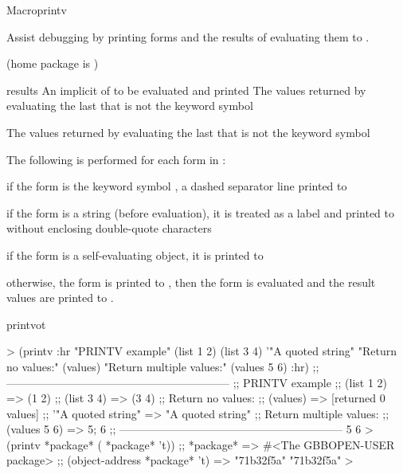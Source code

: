 \documentclass[10pt,twoside,english,pdftex]{article}
\begin{document}

\begin{functiondoc}{Macro}{printv}{%
    }
% 

\fnsyntax

\fnpurpose Assist debugging by printing forms and the results of
evaluating them to .

\fnpackage {} (home package is
)

\fnmodule {}

\fnargs
\begin{args}{results}
\arg[forms] An implicit  of  to be
evaluated and printed  
\arg[results] The values returned by evaluating the last 
that is not the keyword symbol 
\end{args}

\fnreturns The values returned by evaluating the last  that is not
the keyword symbol 

\fndescription The following is performed for each form in :
\begin{tightitemize}
\item if the form is the keyword symbol , a dashed separator line
  printed to 
\item if the form is a string (before evaluation), it is treated as a label
  and printed to  without enclosing double-quote
  characters
\item if the form is a self-evaluating object, it is printed to
\item otherwise, the form is printed to , then the
  form is evaluated and the result values are printed to
  .
\end{tightitemize}

\begin{alsos}{printvot}
\also[printvot]
\end{alsos}

%
\fnexamples
%
\W\supp
\begin{example}
  > (printv :hr "PRINTV example" (list 1 2) (list 3 4) '"A quoted string" 
            "Return no values:" (values)
            "Return multiple values:" (values 5 6) :hr)
  ;; ------------------------------------------------------------
  ;; PRINTV example
  ;;   (list 1 2) => (1 2)
  ;;   (list 3 4) => (3 4)
  ;; Return no values:
  ;;   (values) => [returned 0 values]
  ;;   '"A quoted string" => "A quoted string"
  ;; Return multiple values:
  ;;   (values 5 6) => 5; 6
  ;; ------------------------------------------------------------
  5
  6\goodpagebreak
  > (printv *package* ( *package* 't))
  ;;  *package* => #<The GBBOPEN-USER package>
  ;;  (object-address *package* 't) => "71b32f5a"
  "71b32f5a"
  >
\end{example}


\end{functiondoc}
\end{document}
